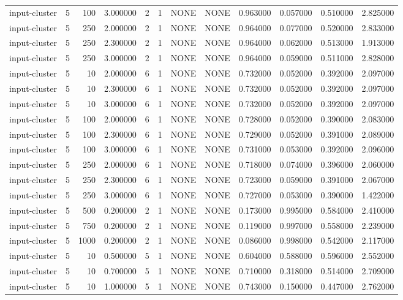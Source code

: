 \begin{tabular}{lrrrllllrrrr}
input-cluster & 5 & 100 & 3.000000 & 2 & 1 & NONE & NONE & 0.963000 & 0.057000 & 0.510000 & 2.825000 \\
input-cluster & 5 & 250 & 2.000000 & 2 & 1 & NONE & NONE & 0.964000 & 0.077000 & 0.520000 & 2.833000 \\
input-cluster & 5 & 250 & 2.300000 & 2 & 1 & NONE & NONE & 0.964000 & 0.062000 & 0.513000 & 1.913000 \\
input-cluster & 5 & 250 & 3.000000 & 2 & 1 & NONE & NONE & 0.964000 & 0.059000 & 0.511000 & 2.828000 \\
input-cluster & 5 & 10 & 2.000000 & 6 & 1 & NONE & NONE & 0.732000 & 0.052000 & 0.392000 & 2.097000 \\
input-cluster & 5 & 10 & 2.300000 & 6 & 1 & NONE & NONE & 0.732000 & 0.052000 & 0.392000 & 2.097000 \\
input-cluster & 5 & 10 & 3.000000 & 6 & 1 & NONE & NONE & 0.732000 & 0.052000 & 0.392000 & 2.097000 \\
input-cluster & 5 & 100 & 2.000000 & 6 & 1 & NONE & NONE & 0.728000 & 0.052000 & 0.390000 & 2.083000 \\
input-cluster & 5 & 100 & 2.300000 & 6 & 1 & NONE & NONE & 0.729000 & 0.052000 & 0.391000 & 2.089000 \\
input-cluster & 5 & 100 & 3.000000 & 6 & 1 & NONE & NONE & 0.731000 & 0.053000 & 0.392000 & 2.096000 \\
input-cluster & 5 & 250 & 2.000000 & 6 & 1 & NONE & NONE & 0.718000 & 0.074000 & 0.396000 & 2.060000 \\
input-cluster & 5 & 250 & 2.300000 & 6 & 1 & NONE & NONE & 0.723000 & 0.059000 & 0.391000 & 2.067000 \\
input-cluster & 5 & 250 & 3.000000 & 6 & 1 & NONE & NONE & 0.727000 & 0.053000 & 0.390000 & 1.422000 \\
input-cluster & 5 & 500 & 0.200000 & 2 & 1 & NONE & NONE & 0.173000 & 0.995000 & 0.584000 & 2.410000 \\
input-cluster & 5 & 750 & 0.200000 & 2 & 1 & NONE & NONE & 0.119000 & 0.997000 & 0.558000 & 2.239000 \\
input-cluster & 5 & 1000 & 0.200000 & 2 & 1 & NONE & NONE & 0.086000 & 0.998000 & 0.542000 & 2.117000 \\
input-cluster & 5 & 10 & 0.500000 & 5 & 1 & NONE & NONE & 0.604000 & 0.588000 & 0.596000 & 2.552000 \\
input-cluster & 5 & 10 & 0.700000 & 5 & 1 & NONE & NONE & 0.710000 & 0.318000 & 0.514000 & 2.709000 \\
input-cluster & 5 & 10 & 1.000000 & 5 & 1 & NONE & NONE & 0.743000 & 0.150000 & 0.447000 & 2.762000 \\

\end{tabular}
